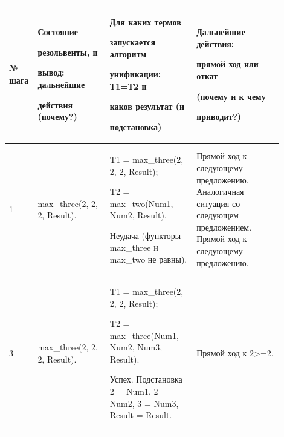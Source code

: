 \documentclass[a4paper,12pt]{article}
\begin{document}
	\begin{center}

		\begin{longtable}[h!]{|p{0.05\linewidth}|p{0.25\linewidth}|p{ 0.3\linewidth}|p{ 0.3\linewidth}|}

			\hline

			{№ шага} & {Состояние 

				

				резольвенты, и 

				

				вывод: дальнейшие 

				

				действия (почему?)} & {Для каких термов 

				

				запускается алгоритм 

				

				унификации: Т1=Т2 и 

				

				каков {\bf результат} (и 

				

				подстановка)} & {Дальнейшие действия: 

				

				прямой ход или откат 

				

				(почему и к чему 

				

				приводит?)}\\

			\hline

			{1} & {max\_three(2, 2, 2, Result).} & {T1 = max\_three(2, 2, 2, Result);

			

		T2 = max\_two(Num1, Num2, Result).

	

Неудача (функторы max\_three и max\_two не равны).} & {Прямой ход к следующему предложению. Аналогичная ситуация со следующем предложением. Прямой ход к следующему предложению.}\\

			\hline

			{3} & {max\_three(2, 2, 2, Result).} & {T1 = max\_three(2, 2, 2, Result);

			

		T2 = max\_three(Num1, Num2, Num3, Result).

	

Успех. Подстановка 2 = Num1, 2 = Num2, 3 = Num3, Result = Result.} & {Прямой ход к 2>=2.}\\


\end{longtable}
\end{center}
\end{document}

